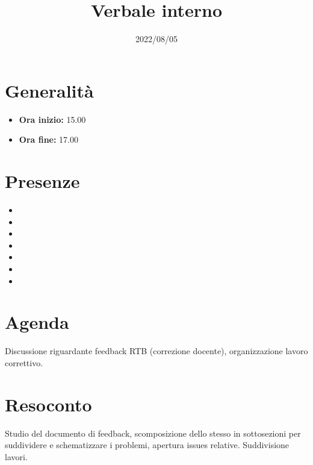 \documentclass{classes/base}
\title{Verbale interno}
\date{2022/08/05}
\author{\marcob}
\renewcommand{\maketitle}{
    
}
\begin{document}
    \maketitle

    \section*{Generalità}
    \begin{itemize}
        \item \textbf{Ora inizio:} 15.00
        \item \textbf{Ora fine:} 17.00
    \end{itemize}

    \section*{Presenze}
    \begin{itemize}
    	\item \angela
        \item \marcob
        \item \matteo
        \item \marcov
        \item \giulio
        \item \ruth
        \item \tommaso
    \end{itemize}

    \section*{Agenda}
    Discussione riguardante feedback RTB (correzione docente), organizzazione lavoro correttivo.

    \section*{Resoconto}
    Studio del documento di feedback, scomposizione dello stesso in sottosezioni 
    per suddividere e schematizzare i problemi, apertura issues relative. 
    Suddivisione lavori.
\end{document}
